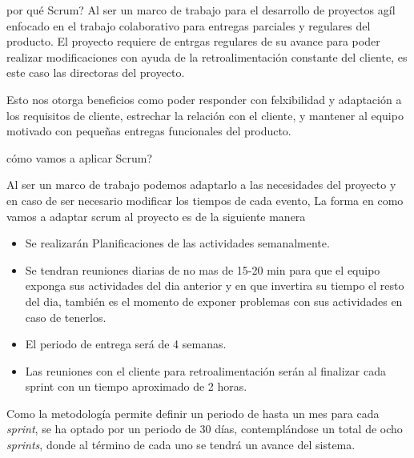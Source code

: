 por qué Scrum?
Al ser un marco de trabajo para el desarrollo de proyectos agíl enfocado en el trabajo colaborativo para entregas parciales y regulares del producto. El proyecto requiere de entrgas regulares de su avance para poder realizar modificaciones con ayuda de la retroalimentación constante del cliente, es este caso las directoras del proyecto.

Esto nos otorga beneficios como poder responder con felxibilidad y adaptación a los requisitos de cliente, estrechar la relación con el cliente, y mantener al equipo motivado con pequeñas entregas funcionales del producto.

cómo vamos a aplicar Scrum?

Al ser un marco de trabajo podemos adaptarlo a las necesidades del proyecto y en caso de ser necesario modificar los tiempos de cada  evento, La forma en como vamos a adaptar scrum al proyecto es de la siguiente manera
\begin{itemize}
	\item Se realizarán Planificaciones de las actividades semanalmente.
	\item Se tendran reuniones diarias de no mas de 15-20 min para que el equipo exponga sus actividades del dia anterior y en que invertira su tiempo el resto del dia, también es el momento de exponer problemas con sus actividades en caso de tenerlos.
	\item El periodo de entrega será de 4 semanas.
	\item Las reuniones con el cliente para retroalimentación serán al finalizar cada sprint con un tiempo aproximado de 2 horas.
\end{itemize}


Como la metodología permite definir un periodo de hasta un mes para cada \textit{sprint}, se ha optado por un periodo de 30 días, contemplándose un total de ocho \textit{sprints}, donde al término de cada uno se tendrá un avance del sistema.